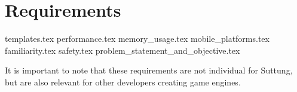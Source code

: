 \chapter{Requirements}
\label{chap:requirements}

{templates.tex}
{performance.tex}
{memory_usage.tex}
{mobile_platforms.tex}
{familiarity.tex}
{safety.tex}
{problem_statement_and_objective.tex}

It is important to note that these requirements are not individual for Suttung,
but are also relevant for other developers creating game engines.
